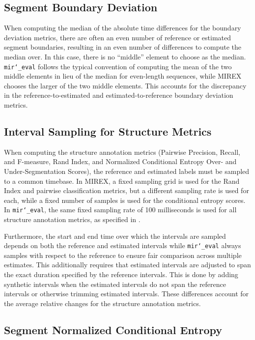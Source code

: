 \documentclass{article}
\def\mireval{\texttt{mir\char`_eval}}
\begin{document}
\subsection{Segment Boundary Deviation}

When computing the median of the absolute time differences for the boundary deviation metrics, there are often an even number of reference or estimated segment boundaries, resulting in an even number of differences to compute the median over.
In this case, there is no ``middle'' element to choose as the median.
\mireval{} follows the typical convention of computing the mean of the two middle elements in lieu of the median for even-length sequences, while MIREX chooses the larger of the two middle elements.
This accounts for the discrepancy in the reference-to-estimated and estimated-to-reference boundary deviation metrics.

\subsection{Interval Sampling for Structure Metrics}

When computing the structure annotation metrics (Pairwise Precision, Recall, and F-measure, Rand Index, and Normalized Conditional Entropy Over- and Under-Segmentation Scores), the reference and estimated labels must be sampled to a common timebase.
In MIREX, a fixed sampling grid is used for the Rand Index and pairwise classification metrics, but a different sampling rate is used for each, while a fixed number of samples is used for the conditional entropy scores.
In \mireval{}, the same fixed sampling rate of 100 milliseconds is used for all structure annotation metrics, as specified in \cite{willis2013mirex}.

Furthermore, the start and end time over which the intervals are sampled depends on both the reference and estimated intervals while \mireval{} always samples with respect to the reference to ensure fair comparison across multiple estimates.
This additionally requires that estimated intervals are adjusted to span the exact duration specified by the reference intervals.
This is done by adding synthetic intervals when the estimated intervals do not span the reference intervals or otherwise trimming estimated intervals.
These differences account for the average relative changes for the structure annotation metrics.

\subsection{Segment Normalized Conditional Entropy}
\end{document}
